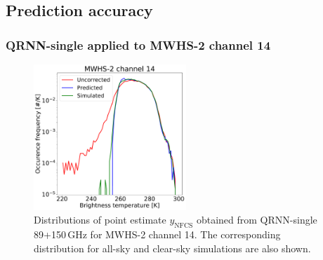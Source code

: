 \documentclass[amt]{copernicus}
\newcommand{\ynfcs}{y_\text{NFCS}}
\begin{document}
\subsection{Prediction accuracy}

\subsubsection{QRNN-single applied to MWHS-2 channel 14} 
\begin{figure}[t]
	\centering
	\includegraphics[height=55mm]{Figures/QRNN_output_mwhs.pdf} 
	\caption{Distributions of point estimate $\ynfcs$ obtained from QRNN-single 89+150\,GHz for MWHS-2 channel 14. The corresponding distribution for all-sky and clear-sky simulations are also shown.}
	\label{fig:distribution_predicted_mwhs14}	
\end{figure}
\end{document}
